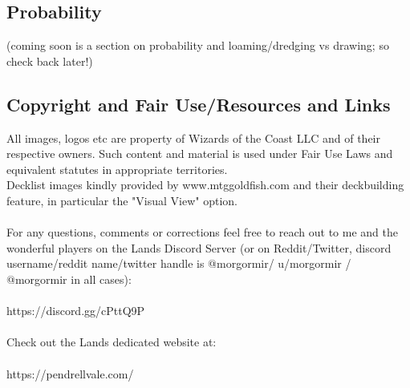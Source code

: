 \documentclass{report}
\begin{document}
\subsection{Probability}
(coming soon is a section on probability and loaming/dredging vs drawing; so check back later!)\\
\subsection{Copyright and Fair Use/Resources and Links}
All images, logos etc are property of Wizards of the Coast LLC and of their respective owners. Such content and material is used under Fair Use Laws and equivalent statutes in appropriate territories.\\
Decklist images kindly provided by www.mtggoldfish.com and their deckbuilding feature, in particular the "Visual View" option.\\\\
For any questions, comments or corrections feel free to reach out to me and the wonderful players on the Lands Discord Server (or on Reddit/Twitter, discord username/reddit name/twitter handle is @morgormir/ u/morgormir / @morgormir in all cases):\\\\
https://discord.gg/cPttQ9P\\\\
Check out the Lands dedicated website at:\\\\
https://pendrellvale.com/\\\\
\end{document}
